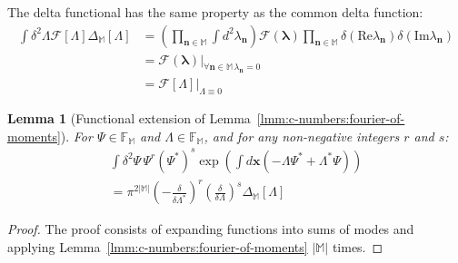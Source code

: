 \documentclass[12pt,aip,jmp,amssymb,amsmath]{revtex4-1}
\newtheorem{lemma}{Lemma}
\begin{document}
The delta functional has the same property as the common delta function:
\begin{equation}\begin{split}
    \int \delta^2 \Lambda \mathcal{F}[\Lambda] \Delta_{\mathbb{M}}[\Lambda]
    & = \left(
            \prod_{\boldsymbol{n} \in \mathbb{M}} \int d^2\lambda_{\boldsymbol{n}}
        \right)
        \mathcal{F}(\boldsymbol{\lambda})
        \prod_{\boldsymbol{n} \in \mathbb{M}} \delta(\mathrm{Re} \lambda_{\boldsymbol{n}}) \delta(\mathrm{Im} \lambda_{\boldsymbol{n}}) \\
    & = \left. \mathcal{F}(\boldsymbol{\lambda}) \right|_{\forall \boldsymbol{n} \in \mathbb{M}\, \lambda_{\boldsymbol{n}} = 0} \\
    & = \left. \mathcal{F}[\Lambda] \right|_{\Lambda \equiv 0}
\end{split}\end{equation}

\begin{lemma}[Functional extension of Lemma~\ref{lmm:c-numbers:fourier-of-moments}]
\label{lmm:func-calculus:fourier-of-moments}
    For $\Psi \in \mathbb{F}_{\mathbb{M}}$ and $\Lambda \in \mathbb{F}_{\mathbb{M}}$, and for any non-negative integers $r$ and $s$:
    \begin{equation*}\begin{split}
        \int \delta^2\Psi\, \Psi^r (\Psi^*)^s \exp \left(
                \int d\boldsymbol{x} \left( -\Lambda \Psi^* + \Lambda^* \Psi \right)
            \right) \\
        = \pi^{2|\mathbb{M}|}
            \left( -\frac{\delta}{\delta \Lambda^*} \right)^r
            \left( \frac{\delta}{\delta \Lambda} \right)^s
            \Delta_{\mathbb{M}}[\Lambda]
    \end{split}\end{equation*}
\end{lemma}
\begin{proof}
The proof consists of expanding functions into sums of modes and applying Lemma~\ref{lmm:c-numbers:fourier-of-moments} $|\mathbb{M}|$ times.
\end{proof}
\end{document}

